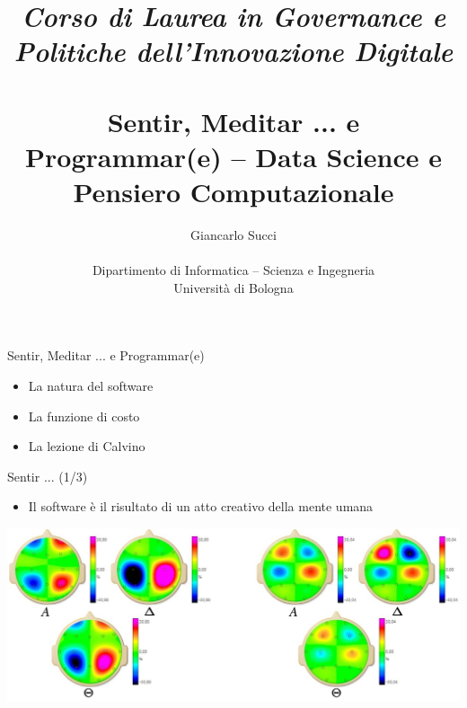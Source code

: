 \documentclass{beamer}
\title[L01]{ {\textit{Corso di Laurea in Governance e Politiche dell'Innovazione Digitale}} \\\\
Sentir, Meditar ... e Programmar(e) -- Data Science e Pensiero Computazionale} %
\author[{\tiny Giancarlo Succi }]{Giancarlo Succi\\\\ Dipartimento di Informatica -- Scienza e Ingegneria\\Universit\`{a} di Bologna\\
\bftt{g.succi@unibo.it}
} %
\institute[unibo] %
\date{} %
\begin{document}
\begin{frame}
\titlepage %

\end{frame}





\begin{frame}
{\centerline{Sentir, Meditar ... e Programmar(e)}}
\begin{itemize}
    \item La natura del software
    \item La funzione di costo
    \item La lezione di Calvino
\end{itemize} 
\end{frame}

\begin{frame}
{\centerline{Sentir ...  (1/3)}}
\begin{itemize}
    \item Il software \`{e} il risultato di un atto creativo della mente umana
\end{itemize} 
\vspace{0.8cm}
\begin{center}
    \includegraphics[width=\textwidth]{A2022.IDSEPC.ConcettoDiSoftware/SoftwareAttoCreativoEEG.png}
\end{center}

\end{frame}
\end{document}
